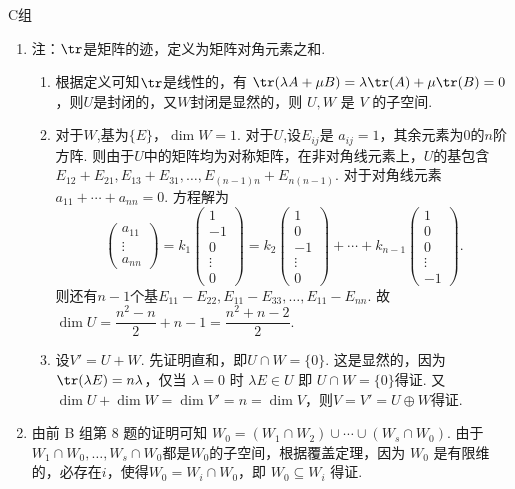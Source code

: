 \centerline{\heiti C组}
\begin{enumerate}
    \item 注：$\tr$是矩阵的迹，定义为矩阵对角元素之和.
          \begin{enumerate}
              \item 根据定义可知$\tr$是线性的，有 $\tr(\lambda A+\mu B)=\lambda\tr(A)+\mu\tr(B)=0$，则$U$是封闭的，又$W$封闭是显然的，则 $U,W$ 是 $V$ 的子空间.

              \item 对于$W$,基为$\{E\}$，$\dim W=1$. 对于$U$,设$E_{ij}$是 $a_{ij}=1$，其余元素为0的$n$阶方阵. 则由于$U$中的矩阵均为对称矩阵，在非对角线元素上，$U$的基包含$E_{12}+E_{21},E_{13}+E_{31},\ldots ,E_{(n-1)n}+E_{n(n-1)}$. 对于对角线元素 $a_{11}+\cdots +a_{nn}=0$. 方程解为
                    \[\begin{pmatrix}a_{11}\\ \vdots\\ a_{nn}	\end{pmatrix}=k_1\begin{pmatrix}1 \\ -1 \\ 0\\ \vdots \\0	\end{pmatrix}=k_2\begin{pmatrix}1 \\ 0 \\ -1\\ \vdots \\0	\end{pmatrix}+\cdots+k_{n-1}\begin{pmatrix}1 \\ 0 \\ 0\\ \vdots \\-1	\end{pmatrix}.\]
                    则还有$n-1$个基$E_{11}-E_{22},E_{11}-E_{33},\ldots ,E_{11}-E_{nn}$. 故 $\dim U=\dfrac{n^2-n}2+n-1=\dfrac{n^2+n-2}2$.

              \item 设$V'=U+W$. 先证明直和，即$U\cap W=\{0\}$. 这是显然的，因为$\tr(\lambda E)=n\lambda$，仅当 $\lambda=0$ 时 $\lambda E\in U$ 即 $U\cap W=\{0\}$得证. 又$\dim U+\dim W=\dim V'=n=\dim V$，则$V=V'=U\oplus W$得证.
          \end{enumerate}

    \item 由前 B 组第 8 题的证明可知 $W_0=(W_1\cap W_2)\cup\cdots\cup(W_s\cap W_0)$. 由于$W_1\cap W_0, \ldots, W_s\cap W_0$都是$W_0$的子空间，根据覆盖定理，因为 $W_0$ 是有限维的，必存在$i$，使得$W_0=W_i\cap W_0$，即 $W_0\subseteq W_i$ 得证.
\end{enumerate}

\clearpage
